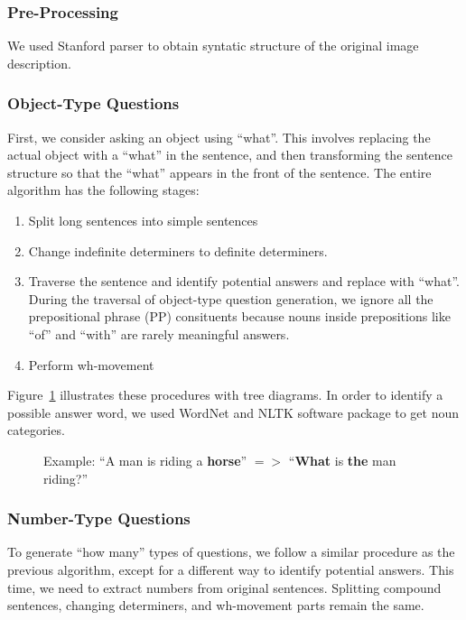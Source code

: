 \documentclass{article}
\renewcommand{\#}[1]{\textbf{#1}}
\begin{document}
\subsubsection{Pre-Processing}
We used Stanford parser \cite{klein03} to obtain syntatic structure of the original image description.

\subsubsection{Object-Type Questions}
First, we consider asking an object using ``what''. This involves replacing the actual object with a ``what'' in the sentence, and then transforming the sentence structure so that the ``what'' appears in the front of the sentence. The entire algorithm has the following stages:
\begin{enumerate}
\item Split long sentences into simple sentences
\item Change indefinite determiners to definite determiners.
\item Traverse the sentence and identify potential answers and replace with ``what''. During the traversal of object-type question generation, we ignore all the prepositional phrase (PP) consituents because nouns inside prepositions like ``of'' and ``with'' are rarely meaningful answers.
\item Perform wh-movement
\end{enumerate}

Figure~\ref{fig:what_gen} illustrates these procedures with tree diagrams. In order to identify a possible answer word, we used WordNet \cite{wordnet} and NLTK software package \cite{nltk} to get noun categories.

\begin{figure}
    \centering
    \small
    \vspace{5mm}
    \caption{Example: ``A man is riding a \textbf{horse}'' $=>$ ``\textbf{What} is \textbf{the} man riding?''}
    \label{fig:what_gen}
\end{figure}

\subsubsection{Number-Type Questions}
To generate ``how many'' types of questions, we follow a similar procedure as the previous algorithm, except for a different way to identify potential answers. This time, we need to extract numbers from original sentences. Splitting compound sentences, changing determiners, and wh-movement parts remain the same.
\end{document}
